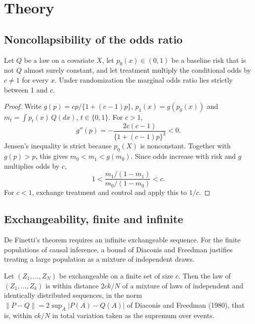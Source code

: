 \chapter{Theory}\label{app:theory}



\section{Noncollapsibility of the odds ratio}

\begin{proposition}
Let $Q$ be a law on a covariate $X$, let $p_0(x) \in (0,1)$ be a baseline risk that is not $Q$ almost surely constant, and let treatment multiply the conditional odds by $c \neq 1$ for every $x$. Under randomization the marginal odds ratio lies strictly between 1 and $c$.
\end{proposition}

\begin{proof}
Write $g(p)=cp/\{1+(c-1)p\}$, $p_1(x)=g(p_0(x))$ and $m_t=\int p_t(x)\,Q(dx)$, $t\in\{0,1\}$. For $c>1$,
\[
g''(p)=-\frac{2c(c-1)}{\{1+(c-1)p\}^3}<0.
\]
Jensen's inequality is strict because $p_0(X)$ is nonconstant. Together with $g(p)>p$, this gives $m_0<m_1<g(m_0)$. Since odds increase with risk and $g$ multiplies odds by $c$,
\[
1<\frac{m_1/(1-m_1)}{m_0/(1-m_0)}<c.
\]
For $c<1$, exchange treatment and control and apply this to $1/c$.
\end{proof}



\section{Exchangeability, finite and infinite}

De Finetti's theorem requires an infinite exchangeable sequence. For the finite populations of causal inference, a bound of Diaconis and Freedman justifies treating a large population as a mixture of independent draws.

\begin{theorem}
Let $(Z_1, \ldots, Z_N)$ be exchangeable on a finite set of size $c$. Then the law of $(Z_1, \ldots, Z_k)$ is within distance $2ck/N$ of a mixture of laws of independent and identically distributed sequences, in the norm $\|P - Q\| = 2\sup_A|P(A) - Q(A)|$ of Diaconis and Freedman (1980), that is, within $ck/N$ in total variation taken as the supremum over events.
\end{theorem}



